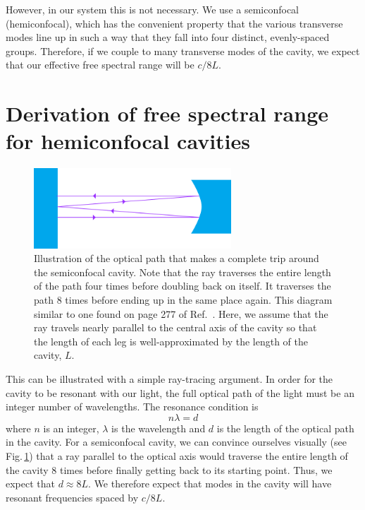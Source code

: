 However, in our system this is not necessary. We use a semiconfocal (hemiconfocal), which has the convenient property that the various transverse modes line up in such a way that they fall into four distinct, evenly-spaced groups. Therefore, if we couple to many transverse modes of the cavity, we expect that our effective free spectral range will be $c/8L$.

\section{Derivation of free spectral range for hemiconfocal cavities}
\begin{figure}
\centerline{\includegraphics[height=3cm]{spectrum_analyzer_path.png}}
\caption{\label{completePath}Illustration of the optical path that makes a complete trip around the semiconfocal cavity. Note that the ray traverses the entire length of the path four times before doubling back on itself. It traverses the path 8 times before ending up in the same place again. This diagram similar to one found on page 277 of Ref.\ \cite{lasersMilonniEberly}. Here, we assume that the ray travels nearly parallel to the central axis of the cavity so that the length of each leg is well-approximated by the length of the cavity, $L$.}
\end{figure}

This can be illustrated with a simple ray-tracing argument. 
In order for the cavity to be resonant with our light, the full optical path of the light must be an integer number of wavelengths. The resonance condition is 
\begin{equation}
n \lambda = d
\end{equation}
where $n$ is an integer, $\lambda$ is the wavelength and $d$ is the length of the optical path in the cavity. 
For a semiconfocal cavity, we can convince ourselves visually (see Fig.\,\ref{completePath}) that a ray parallel to the optical axis would traverse the entire length of the cavity 8 times before finally getting back to its starting point. Thus, we expect that $d\approx 8L$.
We therefore expect that modes in the cavity will have resonant frequencies spaced by $c/8L$. 


